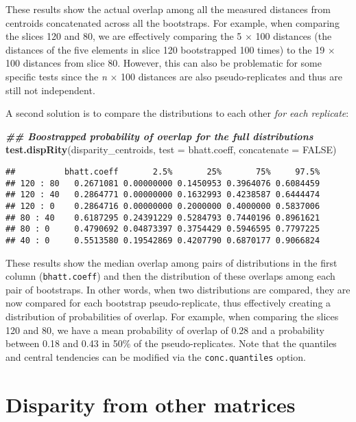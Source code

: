 \documentclass[
]{book}
\newenvironment{Shaded}{\begin{snugshade}}{\end{snugshade}}
\newcommand{\AttributeTok}[1]{\textcolor[rgb]{0.13,0.29,0.53}{#1}}
\newcommand{\ConstantTok}[1]{\textcolor[rgb]{0.56,0.35,0.01}{#1}}
\newcommand{\DocumentationTok}[1]{\textcolor[rgb]{0.56,0.35,0.01}{\textbf{\textit{#1}}}}
\newcommand{\FunctionTok}[1]{\textcolor[rgb]{0.13,0.29,0.53}{\textbf{#1}}}
\newcommand{\NormalTok}[1]{#1}
\begin{document}
These results show the actual overlap among all the measured distances from centroids concatenated across all the bootstraps.
For example, when comparing the slices 120 and 80, we are effectively comparing the 5 \(\times\) 100 distances (the distances of the five elements in slice 120 bootstrapped 100 times) to the 19 \(\times\) 100 distances from slice 80.
However, this can also be problematic for some specific tests since the \emph{n} \(\times\) 100 distances are also pseudo-replicates and thus are still not independent.

A second solution is to compare the distributions to each other \emph{for each replicate}:

\begin{Shaded}
\begin{Highlighting}[]
\DocumentationTok{\#\# Boostrapped probability of overlap for the full distributions}
\FunctionTok{test.dispRity}\NormalTok{(disparity\_centroids, }\AttributeTok{test =}\NormalTok{ bhatt.coeff,}
              \AttributeTok{concatenate =} \ConstantTok{FALSE}\NormalTok{)}
\end{Highlighting}
\end{Shaded}

\begin{verbatim}
##          bhatt.coeff       2.5%       25%       75%     97.5%
## 120 : 80   0.2671081 0.00000000 0.1450953 0.3964076 0.6084459
## 120 : 40   0.2864771 0.00000000 0.1632993 0.4238587 0.6444474
## 120 : 0    0.2864716 0.00000000 0.2000000 0.4000000 0.5837006
## 80 : 40    0.6187295 0.24391229 0.5284793 0.7440196 0.8961621
## 80 : 0     0.4790692 0.04873397 0.3754429 0.5946595 0.7797225
## 40 : 0     0.5513580 0.19542869 0.4207790 0.6870177 0.9066824
\end{verbatim}

These results show the median overlap among pairs of distributions in the first column (\texttt{bhatt.coeff}) and then the distribution of these overlaps among each pair of bootstraps.
In other words, when two distributions are compared, they are now compared for each bootstrap pseudo-replicate, thus effectively creating a distribution of probabilities of overlap.
For example, when comparing the slices 120 and 80, we have a mean probability of overlap of 0.28 and a probability between 0.18 and 0.43 in 50\% of the pseudo-replicates.
Note that the quantiles and central tendencies can be modified via the \texttt{conc.quantiles} option.

\hypertarget{other-matrices}{%
\section{Disparity from other matrices}\label{other-matrices}}
\end{document}
